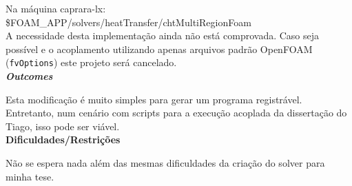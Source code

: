 Na máquina caprara-lx: \$FOAM\_APP/solvers/heatTransfer/chtMultiRegionFoam\\

A necessidade desta implementação ainda não está comprovada. Caso seja possível e 
o acoplamento utilizando apenas arquivos padrão OpenFOAM (\texttt{fvOptions}) 
este projeto será cancelado.\\

\textbf{\textit{Outcomes}}

Esta modificação é muito simples para gerar um programa registrável. Entretanto, 
num cenário com scripts para a execução acoplada da dissertação do Tiago, isso 
pode ser viável.\\

\textbf{Dificuldades/Restrições}

Não se espera nada além das mesmas dificuldades da criação do solver para minha 
tese. \\

